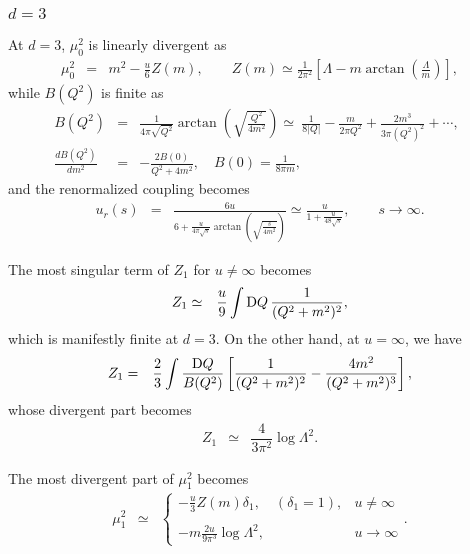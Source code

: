 \documentclass[preprint]{ptephy_v1}%
\newcommand{\rmD}{{\rm D}}
\begin{document}
\subsubsection{$d=3$}
At $d=3$, $\mu_0^2$ is linearly divergent as
\begin{eqnarray}
\mu_0^2 &= & m^2-\frac{u}{6} Z(m), \qquad Z(m)\simeq\frac{1}{ 2\pi^2}\left[\Lambda - m  \arctan \left(\frac{\Lambda}{m} \right) \right],
\end{eqnarray} 
while $B(Q^2)$ is finite as 
\begin{eqnarray}  
B(Q^2) &=&  \frac{1}{4\pi\sqrt{Q^2} } \arctan \left(\sqrt{\frac{Q^2}{4 m^2}}\right)
\simeq\ \frac{1}{8\vert Q\vert} -\frac{ m }{2\pi Q^2} +\frac{2  m^3}{3\pi (Q^2)^2}+\cdots, ~~
 \\
\frac{d B(Q^2)}{d m^2} &=& -\frac{2 B(0)}{Q^2+4m^2},
\quad B(0) =\frac{1}{8\pi m},
\end{eqnarray} 
and the renormalized coupling becomes
\begin{eqnarray} 
u_r(s) &=& \frac{6u}{\displaystyle 6 + \frac{u}{4\pi\sqrt{s} } \arctan \left(\sqrt{\frac{s}{4 m^2}}\right)}
\simeq \frac{ u }{ \displaystyle 1 +\frac{u}{48 \sqrt{s}} }, \qquad s\rightarrow\infty .
\end{eqnarray} 


The most singular term of $Z_1$ for $u\not=\infty$ becomes
\begin{eqnarray}
Z_1 &\simeq&\frac{u}{ 9} \int \rmD Q\, \frac{1}{(Q^2+m^2)^2},
\label{eq:Z_1}
\end{eqnarray}
which is manifestly finite at $d=3$. On the other hand, at $u=\infty$, we have
\begin{eqnarray}
Z_1 &=&\frac{2}{3} \int \frac{\rmD Q}{B(Q^2)}\left[\frac{1}{(Q^2+m^2)^2} -\frac{4 m^2}{ (Q^2+m^2)^3}\right],
\end{eqnarray} 
whose divergent part becomes
\begin{eqnarray}
Z_1 &\simeq & 
\dfrac{4}{3\pi^2}\log \Lambda^2 .
\end{eqnarray} 

The most divergent part of $\mu_1^2$ becomes
\begin{eqnarray}
\mu^2_1 &\simeq&\left\{
\begin{array}{ll}
\displaystyle -\frac{u}{3}Z(m)\delta_1, \quad (\delta_1=1), & u\not=\infty \\
\\
 \displaystyle - m\frac{2 u }{9\pi^3}   \log \Lambda^2 ,  & u\rightarrow\infty
\end{array} \right. .
\end{eqnarray}
\end{document}
